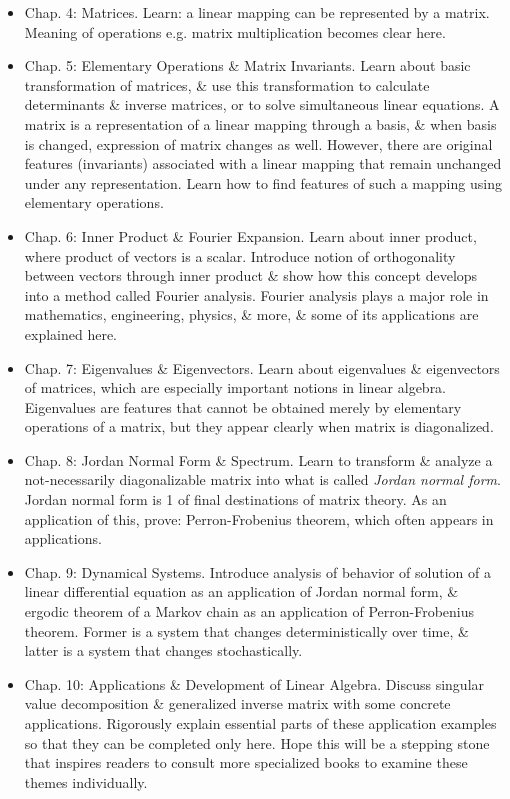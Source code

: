 \documentclass{article}
\begin{document}
\begin{itemize}
\begin{itemize}
\begin{itemize}
			\item {\sf Chap. 4: Matrices.} Learn: a linear mapping can be represented by a matrix. Meaning of operations e.g. matrix multiplication becomes clear here.
			\item {\sf Chap. 5: Elementary Operations \& Matrix Invariants.} Learn about basic transformation of matrices, \& use this transformation to calculate determinants \& inverse matrices, or to solve simultaneous linear equations. A matrix is a representation of a linear mapping through a basis, \& when basis is changed, expression of matrix changes as well. However, there are original features (invariants) associated with a linear mapping that remain unchanged under any representation. Learn how to find features of such a mapping using elementary operations.
			\item {\sf Chap. 6: Inner Product \& Fourier Expansion.} Learn about inner product, where product of vectors is a scalar. Introduce notion of orthogonality between vectors through inner product \& show how this concept develops into a method called Fourier analysis. Fourier analysis plays a major role in mathematics, engineering, physics, \& more, \& some of its applications are explained here.
			\item {\sf Chap. 7: Eigenvalues \& Eigenvectors.} Learn about eigenvalues \& eigenvectors of matrices, which are especially important notions in linear algebra. Eigenvalues are features that cannot be obtained merely by elementary operations of a matrix, but they appear clearly when matrix is diagonalized.
			\item {\sf Chap. 8: Jordan Normal Form \& Spectrum.} Learn to transform \& analyze a not-necessarily diagonalizable matrix into what is called {\it Jordan normal form}. Jordan normal form is 1 of final destinations of matrix theory. As an application of this, prove: Perron-Frobenius theorem, which often appears in applications.
			\item {\sf Chap. 9: Dynamical Systems.} Introduce analysis of behavior of solution of a linear differential equation as an application of Jordan normal form, \& ergodic theorem of a Markov chain as an application of Perron-Frobenius theorem. Former is a system that changes deterministically over time, \& latter is a system that changes stochastically.
			\item {\sf Chap. 10: Applications \& Development of Linear Algebra.} Discuss singular value decomposition \& generalized inverse matrix with some concrete applications. Rigorously explain essential parts of these application examples so that they can be completed only here. Hope this will be a stepping stone that inspires readers to consult more specialized books to examine these themes individually.

\end{itemize}
\end{itemize}
\end{itemize}
\end{document}
